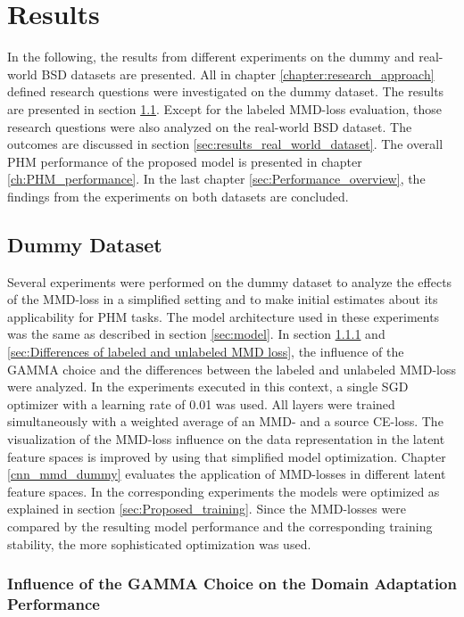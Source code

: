 \chapter{Results}\label{sec:results}

In the following, the results from different experiments on the dummy and real-world BSD datasets are presented. All in chapter \ref{chapter:research_approach} defined research questions were investigated on the dummy dataset. The results are presented in section \ref{sec:results_dummy_dataset}. Except for the labeled MMD-loss evaluation, those research questions were also analyzed on the real-world BSD dataset. The outcomes are discussed in section \ref{sec:results_real_world_dataset}. The overall PHM performance of the proposed model is presented in chapter \ref{ch:PHM_performance}. In the last chapter \ref{sec:Performance_overview}, the findings from the experiments on both datasets are concluded.




\section{Dummy Dataset}\label{sec:results_dummy_dataset}
Several experiments were performed on the dummy dataset to analyze the effects of the MMD-loss in a simplified setting and to make initial estimates about its applicability for PHM tasks. The model architecture used in these experiments was the same as described in section \ref{sec:model}. In section \ref{sec:Balancing Cross-Entropy and MMD loss} and \ref{sec:Differences of labeled and unlabeled MMD loss}, the influence of the GAMMA choice and the differences between the labeled and unlabeled MMD-loss were analyzed. In the experiments executed in this context, a single SGD optimizer with a learning rate of 0.01 was used. All layers were trained simultaneously with a weighted average of an MMD- and a source CE-loss. The visualization of the MMD-loss influence on the data representation in the latent feature spaces is improved by using that simplified model optimization. Chapter \ref{cnn_mmd_dummy} evaluates the application of MMD-losses in different latent feature spaces. In the corresponding experiments the models were optimized as explained in section \ref{sec:Proposed_training}. Since the MMD-losses were compared by the resulting model performance and the corresponding training stability, the more sophisticated optimization was used.

\subsection{Influence of the GAMMA Choice on the Domain Adaptation Performance} \label{sec:Balancing Cross-Entropy and MMD loss}


